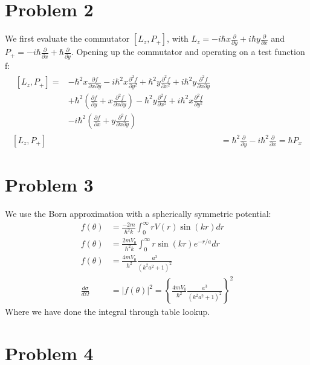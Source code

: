 \documentclass[a4paper,11pt]{article}
\numberwithin{equation}{section}
\begin{document}
\section{Problem 2}
We first evaluate the commutator $[L_z,P_+]$, with $L_z=-i\hbar x\frac{\partial}{\partial y}+i\hbar y\frac{\partial}{\partial x}$
and $P_+=-i\hbar \frac{\partial}{\partial x}+\hbar \frac{\partial}{\partial y}$.
Opening up the commutator and operating on a test function f:
\begin{align}
 \begin{split}
 [L_z,P_+] = &-\hbar^2x\frac{\partial f}{\partial x \partial y}-i\hbar^2x\frac{\partial^2f}{\partial y^2}+\hbar^2y\frac{\partial^2f}{\partial x^2}+i\hbar^2y\frac{\partial^2f}{\partial x \partial y}\\
  &+\hbar^2\left(\frac{\partial f}{\partial y}+x\frac{\partial^2f}{\partial x \partial y} \right)-\hbar^2y\frac{\partial^2 f}{\partial x^2}+i\hbar^2x\frac{\partial^2 f}{\partial y^2}\\
  &-i\hbar^2\left(\frac{\partial f}{\partial x}+y\frac{\partial^2 f}{\partial x \partial y} \right)
 \end{split}\\
 [L_z,P_+] &= \hbar^2\frac{\partial}{\partial y}-i\hbar^2\frac{\partial}{\partial x} = \hbar P_x
\end{align}

\section{Problem 3}
We use the Born approximation with a spherically symmetric potential:
\begin{align}
 f(\theta) &= \frac{-2m}{\hbar^2 k}\int_0^\infty rV(r)\sin{(kr)} dr\\
 f(\theta) &= \frac{2mV_0}{\hbar^2 k}\int_0^\infty r \sin{(kr)} e^{-r/a}dr\\
 f(\theta) &= \frac{4mV_0}{\hbar^2}\frac{a^3}{\left(k^2a^2+1 \right)^2}\\
 \frac{d\sigma}{d\Omega} &= |f(\theta)|^2 = \left\{\frac{4mV_0}{\hbar^2}\frac{a^3}{\left(k^2a^2+1 \right)^2} \right\}^2
\end{align}
Where we have done the integral through table lookup.

\section{Problem 4}
\end{document}
